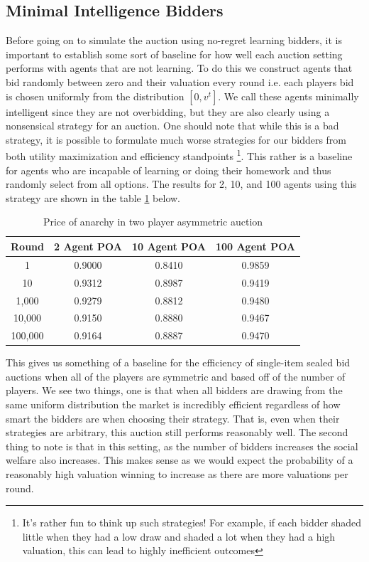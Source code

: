 \documentclass[12pt,twoside]{reedthesis}
\begin{document}
\subsection{Minimal Intelligence Bidders}
Before going on to simulate the auction using no-regret learning bidders, it is important to establish some sort of baseline for how well each auction setting performs with agents that are not learning. To do this we construct agents that bid randomly between zero and their valuation every round i.e. each players bid is chosen uniformly from the distribution $[0,v^t]$. We call these agents minimally intelligent since they are not overbidding, but they are also clearly using a nonsensical strategy for an auction. One should note that while this is a bad strategy, it is possible to formulate much worse strategies for our bidders from both utility maximization and efficiency standpoints \footnote{It's rather fun to think up such strategies! For example, if each bidder shaded little when they had a low draw and shaded a lot when they had a high valuation, this can lead to highly inefficient outcomes}. This rather is a baseline for agents who are incapable of learning or doing their homework and thus randomly select from all options. The results for 2, 10, and 100 agents using this strategy are shown in the table \ref{table:zero_int_symmetric} below.

\begin{table}[h!]
	\begin{center}
		\begin{tabular}{ |c|c|c|c| }
			\hline
			Round & 2 Agent POA & 10 Agent POA & 100 Agent POA \\
			\hline
			1 & 0.9000 & 0.8410 & 0.9859\\
			10 & 0.9312 & 0.8987 & 0.9419\\
			1,000 & 0.9279 & 0.8812 & 0.9480\\
			10,000 & 0.9150 & 0.8880 & 0.9467\\
			100,000 & 0.9164 & 0.8887 & 0.9470\\
			\hline
		\end{tabular}
		\caption{Price of anarchy in two player asymmetric auction}
		\label{table:zero_int_symmetric}
	\end{center} 
\end{table}

This gives us something of a baseline for the efficiency of single-item sealed bid auctions when all of the players are symmetric and based off of the number of players. We see two things, one is that when all bidders are drawing from the same uniform distribution the market is incredibly efficient regardless of how smart the bidders are when choosing their strategy. That is, even when their strategies are arbitrary, this auction still performs reasonably well. The second thing to note is that in this setting, as the number of bidders increases the social welfare also increases. This makes sense as we would expect the probability of a reasonably high valuation winning to increase as there are  more valuations per round. 
\end{document}
